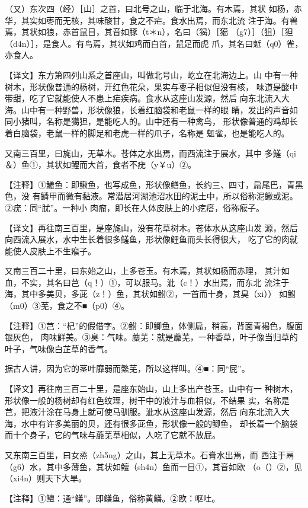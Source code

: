 \documentclass[a4paper,12pt,UTF8,twoside]{ctexbook}
\begin{document}
（又）东次四（经）［山］之首，曰北号之山，临于北海。有木焉，其状 如杨，赤华，其实如枣而无核，其味酸甘，食之不疟。食水出焉，而东北流 注于海。有兽焉，其状如狼，赤首鼠目，其音如豚（t＊n），名曰（猲）［獦 （g7）］（狙）［狚（d4n）］，是食人。有鸟焉，其状如鸡而白首，鼠足而虎 爪，其名曰鬿（q0）雀，亦食人。

【译文】东方第四列山系之首座山，叫做北号山，屹立在北海边上。山 中有一种树木，形状像普通的杨树，开红色花朵，果实与枣子相似但没有核， 味道是酸中带甜，吃了它就能使人不患上疟疾病。食水从这座山发源，然后 向东北流入大海。山中有一种野兽，形状像狼，长着红脑袋和老鼠一样的眼 睛，发出的声音如同小猪叫，名称是獦狚，是能吃人的。山中还有一种禽鸟， 形状像普通的鸡却长着白脑袋，老鼠一样的脚足和老虎一样的爪子，名称是 鬿雀，也是能吃人的。

又南三百里，曰旄山，无草木。苍体之水出焉，而西流注于展水，其中 多鱃（qi＆）鱼①，其状如鲤而大首，食者不疣（y￥u）②。

【注释】①鱃鱼：即鳅鱼，也写成鱼，形状像鳝鱼，长约三、四寸，扁尾巴，青黑色，没 有鳞甲而微有黏液。常潜居河湖池沼水田的泥土中，所以俗称泥鳅或泥。②疣：同“肬”。一种小 肉瘤，即长在人体皮肤上的小疙瘩，俗称瘊子。

【译文】再往南三百里，是座旄山，没有花草树木。苍体水从这座山发 源，然后向西流入展水，水中生长着很多鱃鱼，形状像鲤鱼而头长得很大， 吃了它的肉就能使人皮肤上不生瘊子。

又南三百二十里，曰东始之山，上多苍玉。有木焉，其状如杨而赤理， 其汁如血，不实，其名曰芑（q！）①，可以服马。泚（c！）水出焉，而东北 流注于海，其中多美贝，多茈（z！）鱼，其状如鲋②，一首而十身，其臭（xi）） 如鲋（m0）③芜，食之不■（p0）④。

【注释】①芑：“杞”的假借字。②鲋：即鲫鱼，体侧扁，稍高，背面青褐色，腹面银灰色， 肉味鲜美。③臭：气味。蘪芜：就是蘼芜，一种香草，叶子像当归草的叶子，气味像白芷草的香气。

据古人讲，因为它的茎叶靡弱而繁芜，所以这样叫。④■：同“屁”。

【译文】再往南三百二十里，是座东始山，山上多出产苍玉。山中有一 种树木，形状像一般的杨树却有红色纹理，树干中的液汁与血相似，不结果 实，名称是芑，把液汁涂在马身上就可使马驯服。泚水从这座山发源，然后 向东北流入大海，水中有许多美丽的贝，还有很多茈鱼，形状像一般的鲫鱼， 却长着一个脑袋而十个身子，它的气味与蘼芜草相似，人吃了它就不放屁。

又东南三百里，曰女烝（zh5ng）之山，其上无草木。石膏水出焉，而 西注于鬲（g6）水，其中多薄鱼，其状如鳣（sh4n）鱼而一目①，其音如欧 （o（）②，见（xi4n）则天下大旱。

【注释】①鳣：通“鳝”。即鳝鱼，俗称黄鳝。②欧：呕吐。
\end{document}

